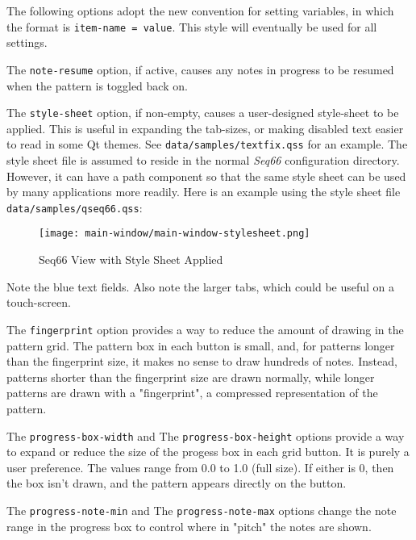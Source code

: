   The following options adopt the new convention for setting variables, in
   which the format is \texttt{item-name = value}.
   This style will eventually be used for all settings.

   The \texttt{note-resume} option, if active, causes any notes in progress
   to be resumed when the pattern is toggled back on.

   The \texttt{style-sheet} option, if non-empty, causes a user-designed
   style-sheet to be applied.  This is useful in expanding the tab-sizes,
   or making disabled text easier to read in some Qt themes.
   See \texttt{data/samples/textfix.qss} for an example.
   The style sheet file is assumed to reside in the normal \textsl{Seq66}
   configuration directory.
   However, it can have a path component so that the same style sheet
   can be used by many applications more readily.
   Here is an example using the style sheet file
   \texttt{data/samples/qseq66.qss}:

\begin{figure}[H]
   \centering 
   \texttt{[image: main-window/main-window-stylesheet.png]}
   \caption{Seq66 View with Style Sheet Applied}
   \label{fig:view_with_style_sheet_applied}
\end{figure}

   Note the blue text fields. Also note the larger tabs, which could be useful on
   a touch-screen.

   The \texttt{fingerprint} option provides a way to reduce the amount of
   drawing in the pattern grid.  The pattern box in each button is small, and,
   for patterns longer than the fingerprint size, it makes no sense to draw
   hundreds of notes.  Instead, patterns shorter than the fingerprint size are
   drawn normally, while longer patterns are drawn with a "fingerprint", a
   compressed representation of the pattern.

   The \texttt{progress-box-width} and
   The \texttt{progress-box-height} options provide a way to expand or reduce
   the size of the progess box in each grid button.
   It is purely a user preference.
   The values range from 0.0 to 1.0 (full size).  If either is 0,
   then the box isn't drawn, and the pattern appears directly on the button.

   The \texttt{progress-note-min} and
   The \texttt{progress-note-max} options change the note range in the progress
   box to control where in "pitch" the notes are shown.

